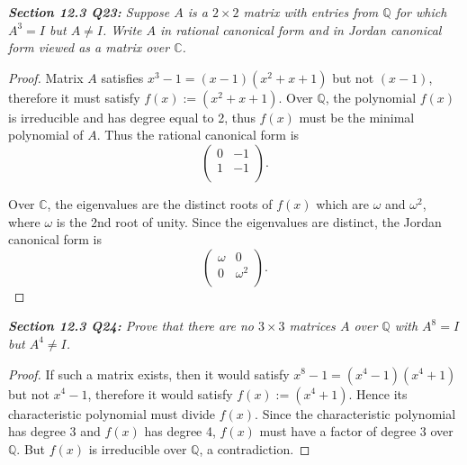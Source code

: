 \documentclass{article}
\begin{document}
\it \textbf{Section 12.3 Q23:} Suppose $A$ is a $2\times2$ matrix with
  entries from $\mathbb{Q}$ for which $A^3=I$ but $A\neq I$. Write $A$ in
  rational canonical form and in Jordan canonical form viewed as a matrix
  over $\mathbb{C}$.

  \begin{proof}
    Matrix $A$ satisfies $x^3-1=(x-1)(x^2+x+1)$ but not $(x-1)$, therefore
    it must satisfy $f(x):=(x^2+x+1)$. Over $\mathbb{Q}$, the polynomial
    $f(x)$ is irreducible and has degree equal to 2, thus $f(x)$ must be the
    minimal polynomial of $A$. Thus the rational canonical form is
    \[\begin{pmatrix} 0&-1\\ 1&-1\\ \end{pmatrix}.\]

    Over $\mathbb{C}$, the eigenvalues are the distinct roots of $f(x)$
    which are $\omega$ and $\omega^2$, where $\omega$ is the 2nd root of
    unity. Since the eigenvalues are distinct, the Jordan canonical form
    is
    \[\begin{pmatrix} \omega&0\\ 0&\omega^2\\ \end{pmatrix}.\]
  \end{proof}

\it \textbf{Section 12.3 Q24:} Prove that there are no $3\times3$ matrices
  $A$ over $\mathbb{Q}$ with $A^8=I$ but $A^4\neq I$. 

  \begin{proof}
    If such a matrix exists, then it would satisfy $x^8-1=(x^4-1)(x^4+1)$
    but not $x^4-1$, therefore it would satisfy $f(x):=(x^4+1)$. Hence its
    characteristic polynomial must divide $f(x)$. Since the characteristic
    polynomial has degree 3 and $f(x)$ has degree 4, $f(x)$ must have a
    factor of degree 3 over $\mathbb{Q}$. But $f(x)$ is irreducible over
    $\mathbb{Q}$, a contradiction.
  \end{proof}
\end{document}
